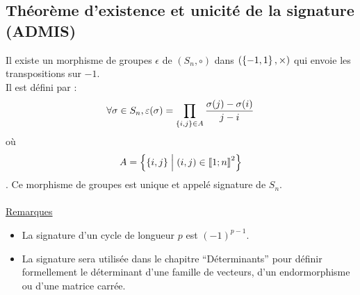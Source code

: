 \subsection{Théorème d’existence et unicité de la signature (ADMIS)}
\begin{theo}
    Il existe un morphisme de groupes \(\epsilon\) de \((S_n, \circ)\) dans \((\left\lbrace-1, 1\right\rbrace, \times)\) qui envoie les transpositions sur \(-1\).\\
    Il est défini par :
    \[\forall\sigma \in S_n, \varepsilon(\sigma) = \prod_{\left\lbrace i,j\right\rbrace\in A} \frac{\sigma(j) - \sigma(i)}{j - i}\]
    où
    \[A = \left\lbrace\left\lbrace i, j\right\rbrace \;\middle|\; (i, j) \in \left\llbracket1;n\right\rrbracket^2\right\rbrace\] .
    Ce morphisme de groupes est unique et appelé signature de \(S_n\).\\~\\
    \underline{Remarques}\\
    \begin{itemize}
        \item La signature d’un cycle de longueur \(p\) est \((-1)^{p-1}\).
        \item La signature sera utilisée dans le chapitre “Déterminants” pour définir formellement le déterminant d’une famille de vecteurs, d’un endormorphisme ou d’une matrice carrée.
    \end{itemize}
\end{theo}

